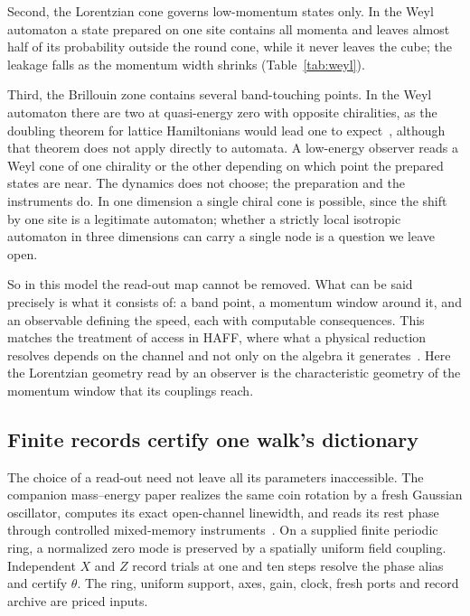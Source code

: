 \documentclass[12pt]{article}
\theoremstyle{definition}
\theoremstyle{remark}
\begin{document}
Second, the Lorentzian cone governs low-momentum states only. In the Weyl automaton a state prepared on one site contains all momenta and leaves almost half of its probability outside the round cone, while it never leaves the cube; the leakage falls as the momentum width shrinks (Table~\ref{tab:weyl}).

Third, the Brillouin zone contains several band-touching points. In the Weyl automaton there are two at quasi-energy zero with opposite chiralities, as the doubling theorem for lattice Hamiltonians would lead one to expect~\cite{NielsenNinomiya1981}, although that theorem does not apply directly to automata. A low-energy observer reads a Weyl cone of one chirality or the other depending on which point the prepared states are near. The dynamics does not choose; the preparation and the instruments do. In one dimension a single chiral cone is possible, since the shift by one site is a legitimate automaton; whether a strictly local isotropic automaton in three dimensions can carry a single node is a question we leave open.

So in this model the read-out map cannot be removed. What can be said precisely is what it consists of: a band point, a momentum window around it, and an observable defining the speed, each with computable consequences. This matches the treatment of access in HAFF, where what a physical reduction resolves depends on the channel and not only on the algebra it generates~\cite{Liu2026PaperA}. Here the Lorentzian geometry read by an observer is the characteristic geometry of the momentum window that its couplings reach.

\subsection{Finite records certify one walk's dictionary}
\label{sec:actual-cone}

The choice of a read-out need not leave all its parameters inaccessible. The companion mass--energy paper realizes the same coin rotation by a fresh Gaussian oscillator, computes its exact open-channel linewidth, and reads its rest phase through controlled mixed-memory instruments~\cite{Liu2026QRAIF_ME}. On a supplied finite periodic ring, a normalized zero mode is preserved by a spatially uniform field coupling. Independent $X$ and $Z$ record trials at one and ten steps resolve the phase alias and certify $\theta$. The ring, uniform support, axes, gain, clock, fresh ports and record archive are priced inputs.
\end{document}
